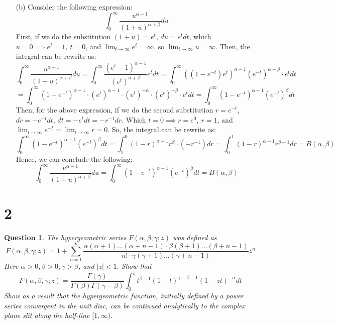 \documentclass{article}
\newtheorem{question}{Question}
\begin{document}
\begin{itemize}
    \item[(b)] Consider the following expression:
    $$\int_{0}^{\infty}\frac{u^{\alpha-1}}{(1+u)^{\alpha+\beta}}du$$
    First, if we do the substitution $(1+u)=e^t$, $du=e^tdt$, which $u=0\implies e^t=1,\ t=0$, and $\lim_{t\rightarrow\infty}e^t=\infty$, so $\lim_{t\rightarrow\infty}u=\infty$. Then, the integral can be rewrite as:
    $$\int_{0}^{\infty}\frac{u^{\alpha-1}}{(1+u)^{\alpha+\beta}}du=\int_{0}^{\infty}\frac{(e^t-1)^{\alpha-1}}{(e^t)^{\alpha+\beta}}e^tdt=\int_{0}^{\infty}((1-e^{-t})e^t)^{\alpha-1}(e^{-t})^{\alpha+\beta}\cdot e^tdt$$
    $$=\int_{0}^{\infty}(1-e^{-t})^{\alpha-1}\cdot (e^{t})^{\alpha-1}\cdot (e^{t})^{-\alpha}\cdot (e^t)^{-\beta}\cdot e^tdt = \int_{0}^{\infty}(1-e^{-t})^{\alpha-1}(e^{-t})^\beta dt$$
    Then, for the above expression, if we do the second substitution $r=e^{-t}$, $dr=-e^{-t}dt$, $dt=-e^tdt = -r^{-1}dr$. Which $t=0\implies r=e^0,\ r=1$, and $\lim_{t\rightarrow\infty}e^{-t}=\lim_{t\rightarrow\infty}r=0$. So, the integral can be rewrite as:
    $$\int_{0}^{\infty}(1-e^{-t})^{\alpha-1}(e^{-t})^\beta dt=\int_{1}^{0}(1-r)^{\alpha-1}r^{\beta}\cdot (-r^{-1})dr = \int_{0}^{1}(1-r)^{\alpha-1}r^{\beta-1}dr = B(\alpha,\beta)$$
    Hence, we can conclude the following:
    $$\int_{0}^{\infty}\frac{u^{\alpha-1}}{(1+u)^{\alpha+\beta}}du=\int_{0}^{\infty}(1-e^{-t})^{\alpha-1}(e^{-t})^\beta dt=B(\alpha,\beta)$$
\end{itemize}

\break

\section*{2}
\begin{myBox}[]{}
    \begin{question}
        The hypergeometric series $F(\alpha,\beta,\gamma; z)$ was defined as 
        $$F(\alpha,\beta,\gamma;z)=1+\sum_{n=1}^{\infty}\frac{\alpha(\alpha+1)...(\alpha+n-1)\cdot \beta(\beta+1)...(\beta+n-1)}{n!\cdot \gamma(\gamma+1)...(\gamma+n-1)}z^n$$
        Here $\alpha>0,\beta>0,\gamma>\beta$, and $|z|<1$. Show that
        $$F(\alpha,\beta,\gamma;z)=\frac{\Gamma(\gamma)}{\Gamma(\beta)\Gamma(\gamma-\beta)}\int_{0}^{1}t^{\beta-1}(1-t)^{\gamma-\beta-1}(1-zt)^{-\alpha}dt$$
        Show as a result that the hypergeometric function, initially defined by a power series convergent in the unit disc, can be continued analytically to the complex plane slit along the half-line $[1,\infty)$.
    \end{question}
\end{myBox}
\end{document}
